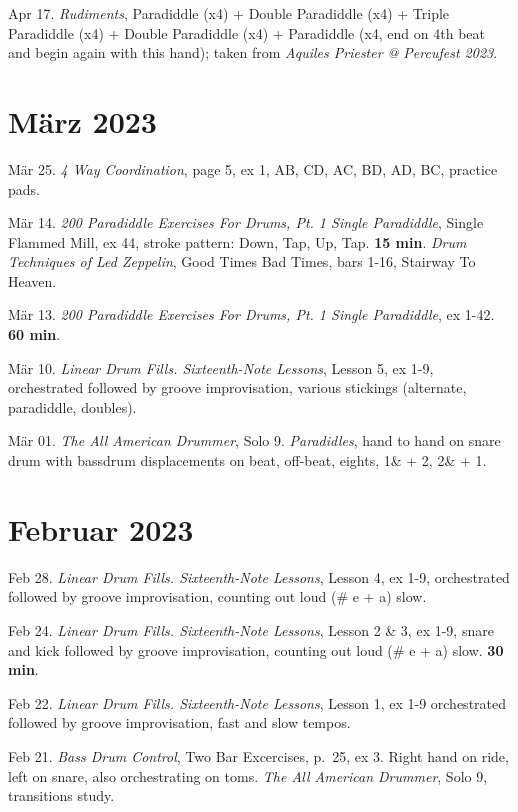 \documentclass[
]{book}
\begin{document}
Apr 17. \emph{Rudiments}, Paradiddle (x4) + Double Paradiddle (x4) + Triple Paradiddle (x4) + Double Paradiddle (x4) + Paradiddle (x4, end on 4th beat and begin again with this hand); taken from \emph{Aquiles Priester @ Percufest 2023}.

\hypertarget{muxe4rz-2023}{%
\section*{März 2023}\label{muxe4rz-2023}}

Mär 25. \emph{4 Way Coordination}, page 5, ex 1, AB, CD, AC, BD, AD, BC, practice pads.

Mär 14. \emph{200 Paradiddle Exercises For Drums, Pt. 1 Single Paradiddle}, Single Flammed Mill, ex 44, stroke pattern: Down, Tap, Up, Tap. \textbf{15 min}. \emph{Drum Techniques of Led Zeppelin}, Good Times Bad Times, bars 1-16, Stairway To Heaven.

Mär 13. \emph{200 Paradiddle Exercises For Drums, Pt. 1 Single Paradiddle}, ex 1-42. \textbf{60 min}.

Mär 10. \emph{Linear Drum Fills. Sixteenth-Note Lessons}, Lesson 5, ex 1-9, orchestrated followed by groove improvisation, various stickings (alternate, paradiddle, doubles).

Mär 01. \emph{The All American Drummer}, Solo 9. \emph{Paradidles}, hand to hand on snare drum with bassdrum displacements on beat, off-beat, eights, 1\& + 2, 2\& + 1.

\hypertarget{februar-2023}{%
\section*{Februar 2023}\label{februar-2023}}

Feb 28. \emph{Linear Drum Fills. Sixteenth-Note Lessons}, Lesson 4, ex 1-9, orchestrated followed by groove improvisation, counting out loud (\# e + a) slow.

Feb 24. \emph{Linear Drum Fills. Sixteenth-Note Lessons}, Lesson 2 \& 3, ex 1-9, snare and kick followed by groove improvisation, counting out loud (\# e + a) slow. \textbf{30 min}.

Feb 22. \emph{Linear Drum Fills. Sixteenth-Note Lessons}, Lesson 1, ex 1-9 orchestrated followed by groove improvisation, fast and slow tempos.

Feb 21. \emph{Bass Drum Control}, Two Bar Excercises, p.~25, ex 3. Right hand on ride, left on snare, also orchestrating on toms. \emph{The All American Drummer}, Solo 9, transitions study.
\end{document}
